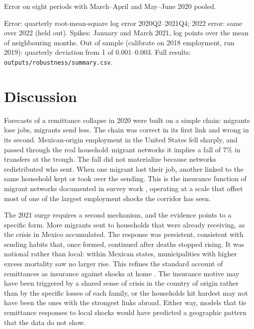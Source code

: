 \documentclass[11pt]{article}
\begin{document}
\begin{table}[t]
\begin{threeparttable}
\begin{tablenotes}\footnotesize
\item[a] Error on eight periods with March--April and May--June 2020 pooled.
\item Error: quarterly root-mean-square log error 2020Q2--2021Q4; 2022 error: same over 2022 (held out). Spikes: January and March 2021, log points over the mean of neighbouring months. Out of sample (calibrate on 2018 employment, run 2019): quarterly deviation from 1 of 0.001--0.003. Full results: \texttt{outputs/robustness/summary.csv}.
\end{tablenotes}
\end{threeparttable}
\end{table}

\section{Discussion}

Forecasts of a remittance collapse in 2020 were built on a simple chain: migrants lose jobs, migrants send less. The chain was correct in its first link and wrong in its second. Mexican-origin employment in the United States fell sharply, and passed through the real household--migrant networks it implies a fall of 7\% in transfers at the trough. The fall did not materialize because networks redistributed who sent. When one migrant lost their job, another linked to the same household kept or took over the sending. This is the insurance function of migrant networks documented in survey work \citep{garip2016,massey2002,munshi2003}, operating at a scale that offset most of one of the largest employment shocks the corridor has seen.

The 2021 surge requires a second mechanism, and the evidence points to a specific form. More migrants sent to households that were already receiving, as the crisis in Mexico accumulated. The response was persistent, consistent with sending habits that, once formed, continued after deaths stopped rising. It was national rather than local: within Mexican states, municipalities with higher excess mortality saw no larger rise. This refines the standard account of remittances as insurance against shocks at home \citep{yangchoi2007,bettin2017}. The insurance motive may have been triggered by a shared sense of crisis in the country of origin rather than by the specific losses of each family, or the households hit hardest may not have been the ones with the strongest links abroad. Either way, models that tie remittance responses to local shocks would have predicted a geographic pattern that the data do not show.
\end{document}
